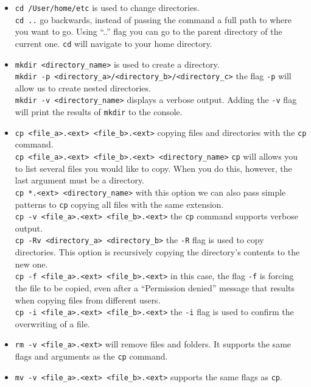 \documentclass{article}
\begin{document}
\begin{itemize}
    	\item {\tt cd /User/home/etc} is used to change directories.\\
    	{\tt cd ..} go backwards, instead of passing the command a full path to where you want to go. Using ``..'' flag you can go to the parent directory of the current one.
    	{\tt cd} will navigate to your home directory.
    	
    	\item {\tt mkdir <directory\_name>} is used to create a directory.\\
    	{\tt mkdir -p <directory\_a>/<directory\_b>/<directory\_c>} the flag {\tt -p} will allow us to create nested directories.\\
    	{\tt mkdir -v <directory\_name>} displays a verbose output. Adding the {\tt -v} flag will print the results of {\tt mkdir} to the console.
    	
    	\item {\tt cp <file\_a>.<ext> <file\_b>.<ext>} copying files and directories with the {\tt cp} command.\\
    	{\tt cp <file\_a>.<ext> <file\_b>.<ext> <directory\_name>} {\tt cp} will allows you to list several files you would like to copy. When you do this, however, the last argument must be a directory.\\
    	{\tt cp *.<ext> <directory\_name>} with this option we can also pass simple patterns to {\tt cp} copying all files with the same extension.\\
    	{\tt cp -v <file\_a>.<ext> <file\_b>.<ext>} the {\tt cp} command supports verbose output.\\
    	{\tt cp -Rv <directory\_a> <directory\_b>} the {\tt -R} flag is used to copy directories. This option is recursively copying the directory's contents to the new one.\\
    	{\tt cp -f <file\_a>.<ext> <file\_b>.<ext>} in this case, the flag {\tt -f} is forcing the file to be copied, even after a ``Permission denied'' message that results when copying files from different users.\\
    	{\tt cp -i <file\_a>.<ext> <file\_b>.<ext>} the {\tt -i} flag is used to confirm the overwriting of a file.
    	
    	\item {\tt rm -v <file\_a>.<ext>} will remove files and folders. It supports the same flags and arguments as the {\tt cp} command.
    	
    	\item {\tt mv -v <file\_a>.<ext> <file\_b>.<ext>} supports the same flags as {\tt cp}.
    \end{itemize}
    
\end{document}
